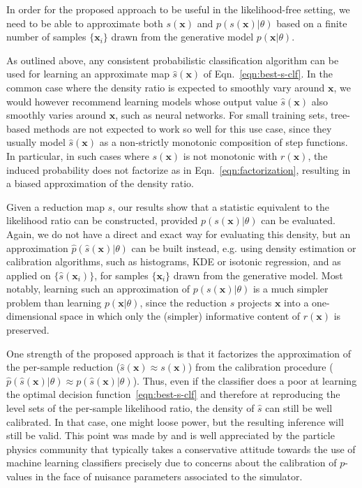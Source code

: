 \documentclass[12pt]{article}
\numberwithin{equation}{section}
\theoremstyle{plain}
\begin{document}
In order for the proposed approach to be useful in the likelihood-free setting,
we need to be able to approximate both $s(\mathbf{x})$ and
$p(s(\mathbf{x})|\theta)$ based on a finite number of samples $\{\mathbf{x}_i\}$
drawn from the generative model $p(\mathbf{x}|\theta)$.

As outlined above, any consistent probabilistic classification algorithm can be
used for learning an approximate  map $\hat{s}(\mathbf{x})$ of
Eqn.~\ref{eqn:best-s-clf}. In the common case where the density ratio is
expected to smoothly vary around $\mathbf{x}$, we would however recommend
learning models whose output value $\hat{s}(\mathbf{x})$ also smoothly varies
around $\mathbf{x}$, such as neural networks. For small training sets, tree-based
methods are not expected to work so well for this use case, since they usually
model $\hat{s}(\mathbf{x})$ as a non-strictly monotonic composition of step functions.
In particular, in such cases where $s(\mathbf{x})$ is not monotonic with $r(\mathbf{x})$,
the induced probability does not factorize as in Eqn.~\ref{eqn:factorization}, resulting in a biased
approximation of the density ratio.

Given a reduction map $s$, our results show that a statistic equivalent to the
likelihood ratio can be constructed, provided $p(s(\mathbf{x})|\theta)$ can be
evaluated. Again, we do not have a direct and exact way for evaluating this
density, but an approximation $\hat p(\hat s(\mathbf{x})| \theta)$ can be built
instead, e.g. using density estimation or calibration algorithms, such as
histograms, KDE or isotonic regression, and as applied on $\{\hat
s(\mathbf{x}_i)\}$, for samples $\{\mathbf{x}_i\}$  drawn from the generative
model. Most notably, learning such an approximation of $p(s(\mathbf{x})|\theta)$
is a much simpler problem than learning $p(\mathbf{x}|\theta)$, since the
reduction $s$ projects $\mathbf{x}$ into a one-dimensional space in which only
the (simpler) informative content of $r(\mathbf{x})$ is preserved.

One strength of the proposed approach is that it factorizes the approximation of
the per-sample reduction ($\hat{s}(\mathbf{x}) \approx s(\mathbf{x})$) from the
calibration procedure ($\hat p(\hat s(\mathbf{x})| \theta) \approx
p(\hat{s}(\mathbf{x})|\theta)$). Thus, even if the classifier does a poor at
learning the optimal decision function~\ref{eqn:best-s-clf} and therefore at
reproducing the level sets of the per-sample likelihood ratio, the density of
$\hat{s}$ can still be well calibrated. In that case, one might loose power, but
the resulting inference will still be valid. This point was made by
\cite{Neal:2007zz} and is well appreciated by the particle physics community
that typically takes a conservative attitude towards the use of machine learning
classifiers precisely due to concerns about the calibration of $p$-values in the
face of nuisance parameters associated to the simulator.
\end{document}
